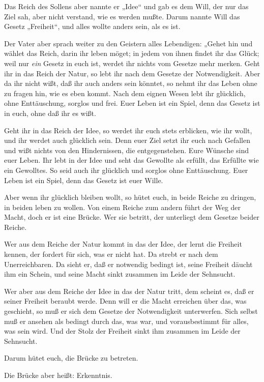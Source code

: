 Das Reich des Sollens aber nannte er „Idee“ und gab es dem Will,
der nur das Ziel sah, aber nicht verstand, wie es werden mußte.
Darum nannte Will das Gesetz „Freiheit“, und alles wollte anders
sein, als es ist.

Der Vater aber sprach weiter zu den Geistern alles Lebendigen:
„Gehet hin und wählet das Reich, darin ihr leben möget; in jedem
von ihnen findet ihr das Glück; weil nur \emph{ein} Gesetz in euch
ist, werdet ihr nichts vom Gesetze mehr merken. Geht ihr in das
Reich der Natur, so lebt ihr nach dem Gesetze der Notwendigkeit.
Aber da ihr nicht wißt, daß ihr auch anders sein könntet, so nehmt
ihr das Leben ohne zu fragen hin, wie es eben kommt. Nach dem
eignen Wesen lebt ihr glücklich, ohne Enttäuschung, sorglos und
frei. Euer Leben ist ein Spiel, denn das Gesetz ist in euch, ohne
daß ihr es wißt.

Geht ihr in das Reich der Idee, so werdet ihr euch stets erblicken,
wie ihr wollt, und ihr werdet auch glücklich sein. Denn euer Ziel
setzt ihr euch nach Gefallen und wißt nichts von den Hindernissen,
die entgegenstehen. Eure Wünsche sind euer Leben. Ihr lebt in der
Idee und seht das Gewollte als erfüllt, das Erfüllte wie ein
Gewolltes. So seid auch ihr glücklich und sorglos ohne
Enttäuschung. Euer Leben ist ein Spiel, denn das Gesetz ist euer
Wille.

Aber wenn ihr glücklich bleiben wollt, so hütet euch, in beide
Reiche zu dringen, in beiden leben zu wollen. Von einem Reiche zum
andern führt der Weg der Macht, doch er ist eine Brücke. Wer sie
betritt, der unterliegt dem Gesetze beider Reiche.

Wer aus dem Reiche der Natur kommt in das der Idee, der lernt die
Freiheit kennen, der fordert für sich, was er nicht hat. Da strebt
er nach dem Unerreichbaren. Da sieht er, daß er notwendig bedingt
ist, seine Freiheit däucht ihm ein Schein, und seine Macht sinkt
zusammen im Leide der Sehnsucht.

Wer aber aus dem Reiche der Idee in das der Natur tritt, dem
scheint es, daß er seiner Freiheit beraubt werde. Denn will er die
Macht erreichen über das, was geschieht, so muß er sich dem Gesetze
der Notwendigkeit unterwerfen. Sich selbst muß er ansehen als
bedingt durch das, was war, und vorausbestimmt für alles, was sein
wird. Und der Stolz der Freiheit sinkt ihm zusammen im Leide der
Sehnsucht.

Darum hütet euch, die Brücke zu betreten.

Die Brücke aber heißt: Erkenntnis.


